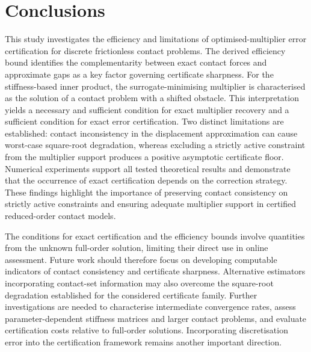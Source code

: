 \section{Conclusions}\label{sec:conclusions}

This study investigates the efficiency and limitations of optimised-multiplier error certification for discrete frictionless contact problems. The derived efficiency bound identifies the complementarity between exact contact forces and approximate gaps as a key factor governing certificate sharpness. For the stiffness-based inner product, the surrogate-minimising multiplier is characterised as the solution of a contact problem with a shifted obstacle. This interpretation yields a necessary and sufficient condition for exact multiplier recovery and a sufficient condition for exact error certification. Two distinct limitations are established: contact inconsistency in the displacement approximation can cause worst-case square-root degradation, whereas excluding a strictly active constraint from the multiplier support produces a positive asymptotic certificate floor. Numerical experiments support all tested theoretical results and demonstrate that the occurrence of exact certification depends on the correction strategy. These findings highlight the importance of preserving contact consistency on strictly active constraints and ensuring adequate multiplier support in certified reduced-order contact models.

The conditions for exact certification and the efficiency bounds involve quantities from the unknown full-order solution, limiting their direct use in online assessment. Future work should therefore focus on developing computable indicators of contact consistency and certificate sharpness. Alternative estimators incorporating contact-set information may also overcome the square-root degradation established for the considered certificate family. Further investigations are needed to characterise intermediate convergence rates, assess parameter-dependent stiffness matrices and larger contact problems, and evaluate certification costs relative to full-order solutions. Incorporating discretisation error into the certification framework remains another important direction.
